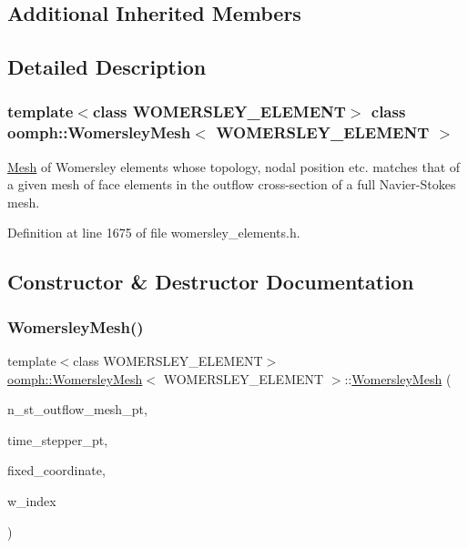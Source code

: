 \subsection*{Additional Inherited Members}


\subsection{Detailed Description}
\subsubsection*{template$<$class W\+O\+M\+E\+R\+S\+L\+E\+Y\+\_\+\+E\+L\+E\+M\+E\+NT$>$\newline
class oomph\+::\+Womersley\+Mesh$<$ W\+O\+M\+E\+R\+S\+L\+E\+Y\+\_\+\+E\+L\+E\+M\+E\+N\+T $>$}

\hyperlink{classoomph_1_1Mesh}{Mesh} of Womersley elements whose topology, nodal position etc. matches that of a given mesh of face elements in the outflow cross-\/section of a full Navier-\/\+Stokes mesh. 

Definition at line 1675 of file womersley\+\_\+elements.\+h.



\subsection{Constructor \& Destructor Documentation}
\mbox{\label{classoomph_1_1WomersleyMesh_a1fc3a748ff68d01051759c9e3c39bca2}} 
\subsubsection{\texorpdfstring{Womersley\+Mesh()}{WomersleyMesh()}}
{\footnotesize\ttfamily template$<$class W\+O\+M\+E\+R\+S\+L\+E\+Y\+\_\+\+E\+L\+E\+M\+E\+NT$>$ \\
\hyperlink{classoomph_1_1WomersleyMesh}{oomph\+::\+Womersley\+Mesh}$<$ W\+O\+M\+E\+R\+S\+L\+E\+Y\+\_\+\+E\+L\+E\+M\+E\+NT $>$\+::\hyperlink{classoomph_1_1WomersleyMesh}{Womersley\+Mesh} (\begin{DoxyParamCaption}\item[{\hyperlink{classoomph_1_1Mesh}{Mesh} $\ast$}]{n\+\_\+st\+\_\+outflow\+\_\+mesh\+\_\+pt,  }\item[{\hyperlink{classoomph_1_1TimeStepper}{Time\+Stepper} $\ast$}]{time\+\_\+stepper\+\_\+pt,  }\item[{const unsigned \&}]{fixed\+\_\+coordinate,  }\item[{const unsigned \&}]{w\+\_\+index }\end{DoxyParamCaption})\hspace{0.3cm}{\ttfamily [inline]}}



